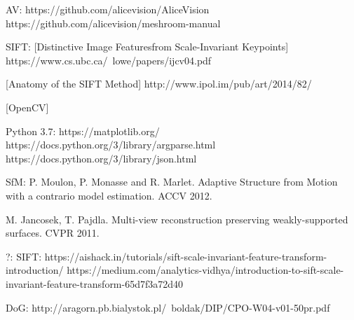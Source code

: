 \iffalse
\begin{thebibliography}{9}
\bibitem{latexcompanion}
Michel Goossens, Frank Mittelbach, and Alexander Samarin.
\textit{The \LaTeX\ Companion}.
Addison-Wesley, Reading, Massachusetts, 1993.

\bibitem{einstein}
Albert Einstein.
\textit{Zur Elektrodynamik bewegter K{\"o}rper} . (German)
[\textit{On the electrodynamics of moving bodies}].
Annalen der Physik, 322(10):891–921, 1905.

\bibitem{knuthwebsite}
Knuth: Computers and Typesetting,
\\\texttt{http://www-cs-faculty.stanford.edu/\~{}uno/abcde.html}
\end{thebibliography}
\fi
AV:
https://github.com/alicevision/AliceVision
https://github.com/alicevision/meshroom-manual

SIFT:
[Distinctive Image Featuresfrom Scale-Invariant Keypoints]
https://www.cs.ubc.ca/~lowe/papers/ijcv04.pdf

[Anatomy of the SIFT Method]
http://www.ipol.im/pub/art/2014/82/

[OpenCV]

Python 3.7:
https://matplotlib.org/
https://docs.python.org/3/library/argparse.html
https://docs.python.org/3/library/json.html

SfM:
P. Moulon, P. Monasse and R. Marlet. Adaptive Structure from Motion with a contrario model estimation. ACCV 2012.

M. Jancosek, T. Pajdla. Multi-view reconstruction preserving weakly-supported surfaces. CVPR 2011.



?:
SIFT:
https://aishack.in/tutorials/sift-scale-invariant-feature-transform-introduction/
https://medium.com/analytics-vidhya/introduction-to-sift-scale-invariant-feature-transform-65d7f3a72d40

DoG:
http://aragorn.pb.bialystok.pl/~boldak/DIP/CPO-W04-v01-50pr.pdf
